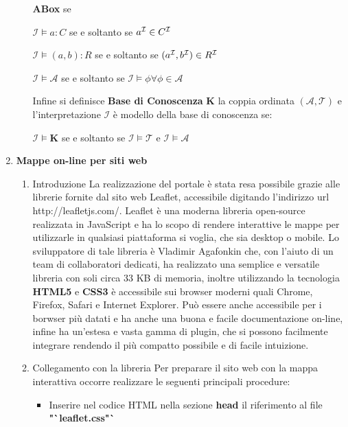 \documentclass[a4paper,11pt]{article}
\newcommand{\I}{%
        \ensuremath{\mathcal{I}}\xspace}
\newcommand{\T}{%
  \ensuremath{\mathcal{T}}\xspace}
\newcommand{\A}{%
  \ensuremath{\mathcal{A}}\xspace}
\newcommand{\K}%
        {\ensuremath{\mathbf{K}}\xspace}
\begin{document}
\begin{enumerate}
\begin{enumerate}[label*=\arabic*.]
\textbf{ABox} se 
\begin{center}
	$\I \models a:C$ se e soltanto se $ a^{\I} \in C^{\I}$
\end{center} 
\begin{center}
	$\I \models (a,b):R$ se e soltanto se $ (a^{\I},b^{\I}) \in R^{\I}$
\end{center}
\begin{center}
	$\I \models \A$ se e soltanto se $\I \models \phi \forall \phi \in \A $
\end{center}
Infine si definisce \textbf{Base di Conoscenza} $\K$ la coppia ordinata $(\A,\T) $ e l'interpretazione $\I$ è modello della base di conoscenza se:
\begin{center}
	$\I \models \K$ se e soltanto se $\I \models \T$ e $\I \models \A $
\end{center}
\end{enumerate}
		\newpage
	\item \LARGE{\textbf{Mappe on-line per siti web}}
		\begin{enumerate}[label*=\arabic*.]
			\Large
			\item {Introduzione}\newline
La realizzazione del portale è stata resa possibile grazie alle librerie fornite dal sito web Leaflet, accessibile digitando l'indirizzo url http://leafletjs.com/.
			Leaflet è una moderna libreria open-source realizzata in JavaScript e ha lo scopo di rendere interattive le mappe per utilizzarle in qualsiasi piattaforma si voglia, che sia desktop o mobile. Lo sviluppatore di tale libreria è Vladimir Agafonkin che, con l'aiuto di un team di collaboratori dedicati, ha realizzato una semplice e versatile libreria con soli circa 33 KB di memoria, inoltre utilizzando la tecnologia \textbf{HTML5} e \textbf{CSS3} è accessibile sui browser moderni quali Chrome, Firefox, Safari e Internet Explorer. Può essere anche accessibile per i borwser più datati e ha anche una buona e facile documentazione on-line, infine ha un'estesa e vasta gamma di plugin, che si possono facilmente integrare rendendo il più compatto possibile e di facile intuizione.	
			\medskip
			\item Collegamento con la libreria\newline
Per preparare il sito web con la mappa interattiva occorre realizzare le seguenti principali procedure:
			\begin{itemize}
				\item Inserire nel codice HTML nella sezione \textbf{head} il riferimento al file \textbf{"`leaflet.css"`}

\end{itemize}
\end{enumerate}
\end{enumerate}
\end{document}
